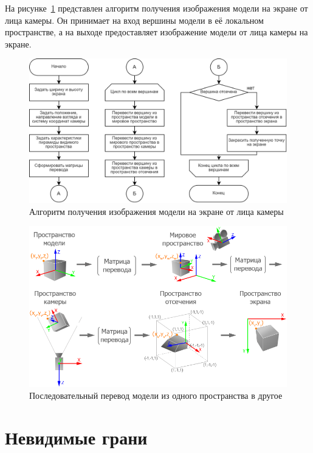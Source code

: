 На рисунке~\ref{fig:camera-image} представлен алгоритм получения изображения модели на экране от лица камеры. Он принимает на вход вершины модели в её локальном пространстве, а на выходе предоставляет изображение модели от лица камеры на экране.
\begin{figure}[h] 
	\centering
	\includegraphics[width=1\textwidth]{images/camera-image.png}
	\caption{Алгоритм получения изображения модели на экране от лица камеры} 
	\label{fig:camera-image} 
\end{figure}
\begin{figure}[h] 
	\centering
	\includegraphics[width=1\textwidth]{images/space_transformations.png}
	\caption{Последовательный перевод модели из одного пространства в другое} 
	\label{fig:space-transformations} 
\end{figure}

\clearpage

\section{Невидимые грани}

